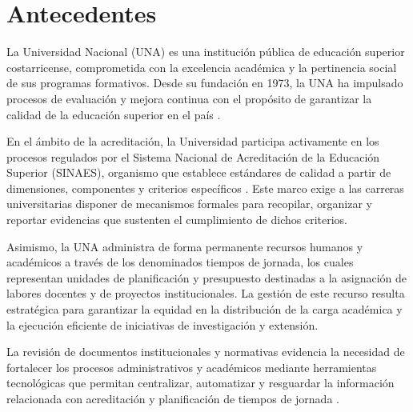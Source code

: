 \chapter{Antecedentes}

La Universidad Nacional (UNA) es una institución pública de educación superior costarricense, comprometida con la excelencia académica y la pertinencia social de sus programas formativos. Desde su fundación en 1973, la UNA ha impulsado procesos de evaluación y mejora continua con el propósito de garantizar la calidad de la educación superior en el país \cite{UNAweb}.

En el ámbito de la acreditación, la Universidad participa activamente en los procesos regulados por el Sistema Nacional de Acreditación de la Educación Superior (SINAES), organismo que establece estándares de calidad a partir de dimensiones, componentes y criterios específicos \cite{SINAES}. Este marco exige a las carreras universitarias disponer de mecanismos formales para recopilar, organizar y reportar evidencias que sustenten el cumplimiento de dichos criterios.

Asimismo, la UNA administra de forma permanente recursos humanos y académicos a través de los denominados tiempos de jornada, los cuales representan unidades de planificación y presupuesto destinadas a la asignación de labores docentes y de proyectos institucionales. La gestión de este recurso resulta estratégica para garantizar la equidad en la distribución de la carga académica y la ejecución eficiente de iniciativas de investigación y extensión.

La revisión de documentos institucionales y normativas evidencia la necesidad de fortalecer los procesos administrativos y académicos mediante herramientas tecnológicas que permitan centralizar, automatizar y resguardar la información relacionada con acreditación y planificación de tiempos de jornada \cite{ReglamentoUNA, InformeSINAES}.
